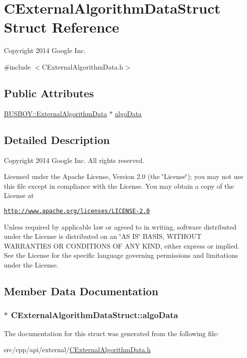 \hypertarget{structCExternalAlgorithmDataStruct}{
\section{CExternalAlgorithmDataStruct Struct Reference}
\label{structCExternalAlgorithmDataStruct}
}


Copyright 2014 Google Inc.  


{\ttfamily \#include $<$CExternalAlgorithmData.h$>$}\subsection*{Public Attributes}
\begin{DoxyCompactItemize}
\item 
\hyperlink{classBUSBOY_1_1ExternalAlgorithmData}{BUSBOY::ExternalAlgorithmData} $\ast$ \hyperlink{structCExternalAlgorithmDataStruct_a6f941da894220faf93ad289b2779eb42}{algoData}
\end{DoxyCompactItemize}


\subsection{Detailed Description}
Copyright 2014 Google Inc. All rights reserved.

Licensed under the Apache License, Version 2.0 (the \char`\"{}License\char`\"{}); you may not use this file except in compliance with the License. You may obtain a copy of the License at

\href{http://www.apache.org/licenses/LICENSE-2.0}{\tt http://www.apache.org/licenses/LICENSE-\/2.0}

Unless required by applicable law or agreed to in writing, software distributed under the License is distributed on an \char`\"{}AS IS\char`\"{} BASIS, WITHOUT WARRANTIES OR CONDITIONS OF ANY KIND, either express or implied. See the License for the specific language governing permissions and limitations under the License. 

\subsection{Member Data Documentation}
\hypertarget{structCExternalAlgorithmDataStruct_a6f941da894220faf93ad289b2779eb42}{
\subsubsection[{algoData}]{$\ast$ {\bf CExternalAlgorithmDataStruct::algoData}}}
\label{structCExternalAlgorithmDataStruct_a6f941da894220faf93ad289b2779eb42}


The documentation for this struct was generated from the following file:\begin{DoxyCompactItemize}
\item 
src/cpp/api/external/\hyperlink{CExternalAlgorithmData_8h}{CExternalAlgorithmData.h}\end{DoxyCompactItemize}
